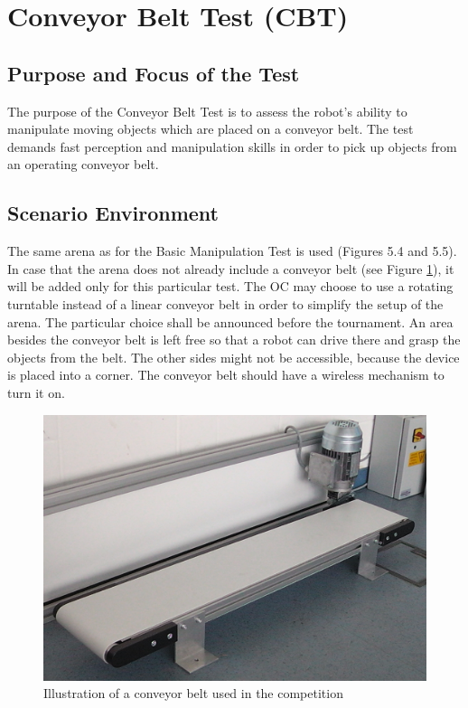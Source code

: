 \section{Conveyor Belt Test (CBT)}


\subsection{Purpose and Focus of the Test}
The purpose of the Conveyor Belt Test is to assess the robot’s ability to manipulate moving objects which are placed on a conveyor belt. The test demands fast perception and manipulation skills in order to pick up objects from an operating conveyor belt.

\subsection{Scenario Environment}
The same arena as for the Basic Manipulation Test is used (Figures 5.4 and 5.5). In case that the arena does not already include a conveyor belt (see Figure \ref{fig:conveyor_belt}), it will be added only for this particular test.
The OC may choose to use a rotating turntable instead of a linear conveyor belt in order to simplify the setup of the arena. The particular choice shall be announced before the tournament.
An area besides the conveyor belt is left free so that a robot can drive there and grasp the objects from the belt. The other sides might not be accessible, because the device is placed into a corner. 
The conveyor belt should have a wireless mechanism to turn it on. 

\begin{figure}
\includegraphics[width= \textwidth ]{../images/conveyor_belt.jpg}
\caption{Illustration of a conveyor belt used in the competition}
\label{fig:conveyor_belt}
\end{figure}


